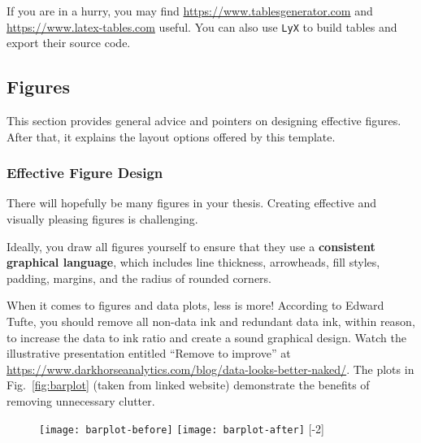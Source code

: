 If you are in a hurry, you may find \url{https://www.tablesgenerator.com} and \url{https://www.latex-tables.com} useful. You can also use \texttt{LyX} to build tables and export their source code.


\subsection{Figures}

This section provides general advice and pointers on designing effective figures. After that, it explains the layout options offered by this template.

\subsubsection{Effective Figure Design}

There will hopefully be many figures in your thesis. Creating effective and visually pleasing figures is challenging.

Ideally, you draw all figures yourself to ensure that they use a \textbf{consistent graphical language}, which includes line thickness, arrowheads, fill styles, padding, margins, and the radius of rounded corners.

When it comes to figures and data plots, less is more! According to Edward Tufte,%
you should remove all non-data ink and redundant data ink, within reason, to increase the data to ink ratio and create a sound graphical design. Watch the illustrative presentation entitled ``Remove to improve'' at \url{https://www.darkhorseanalytics.com/blog/data-looks-better-naked/}. The plots in Fig.~\ref{fig:barplot} (taken from linked website) demonstrate the benefits of removing unnecessary clutter.


\begin{figure}[t]
\centering
\texttt{[image: barplot-before]}%
\hspace{\fill}%
\texttt{[image: barplot-after]}
[-2\baselineskip]
\end{figure}


